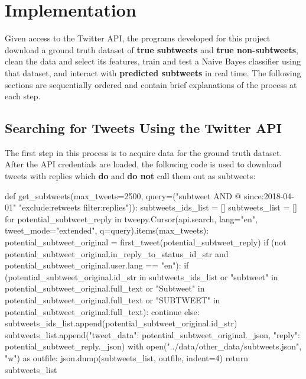 \documentclass[11pt, twoside, reqno]{book}
\begin{document}
\chapter{Implementation}
\label{implementation}

Given access to the Twitter API, the programs developed for this project download a ground truth dataset of \textbf{true subtweets} and \textbf{true non-subtweets}, clean the data and select its features, train and test a Naive Bayes classifier using that dataset, and interact with \textbf{predicted subtweets} in real time. The following sections are sequentially ordered and contain brief explanations of the process at each step.

\section{Searching for Tweets Using the Twitter API}
\label{searching_with_api}

The first step in this process is to acquire data for the ground truth dataset. After the API credentials are loaded, the following code is used to download tweets with replies which \textbf{do} and \textbf{do not} call them out as subtweets:
\pagebreak
\begin{python}
def get_subtweets(max_tweets=2500, 
                  query=("subtweet AND @ since:2018-04-01" 
                         "exclude:retweets filter:replies")):
    subtweets_ids_list = []
    subtweets_list = []
    for potential_subtweet_reply in tweepy.Cursor(api.search, lang="en", 
                                                  tweet_mode="extended", 
                                                  q=query).items(max_tweets):
        potential_subtweet_original = first_tweet(potential_subtweet_reply)
        if (not potential_subtweet_original.in_reply_to_status_id_str 
            and potential_subtweet_original.user.lang == "en"):
            if (potential_subtweet_original.id_str in subtweets_ids_list 
                or "subtweet" in potential_subtweet_original.full_text 
                or "Subtweet" in potential_subtweet_original.full_text 
                or "SUBTWEET" in potential_subtweet_original.full_text):
                continue
            else:
                subtweets_ids_list.append(potential_subtweet_original.id_str)
                subtweets_list.append({"tweet_data": potential_subtweet_original._json, 
                                       "reply": potential_subtweet_reply._json})
                with open("../data/other_data/subtweets.json", "w") as outfile:
                    json.dump(subtweets_list, outfile, indent=4)
    return subtweets_list
\end{python}
\end{document}
